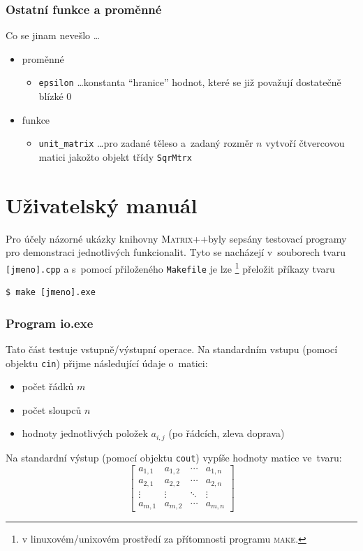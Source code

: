 \documentclass[11pt,a4paper]{article}
\newcommand{\mpp}{\textsc{Matrix++}}
\theoremstyle{remark}
\begin{document}
\section{Ostatní funkce a proměnné}

Co se jinam nevešlo \ldots

\begin{itemize}
\item proměnné
  \begin{itemize}
  \item \verb=epsilon= \ldots konstanta ``hranice'' hodnot, které se již
    považují dostatečně blízké $0$
  \end{itemize}
\item funkce
  \begin{itemize}
  \item \verb=unit_matrix= \ldots pro zadané těleso a~zadaný rozměr $n$ vytvoří
    čtvercovou matici jakožto objekt třídy \verb=SqrMtrx=
  \end{itemize}
\end{itemize}

\pagebreak

\part{Uživatelský manuál}
Pro účely názorné ukázky knihovny \mpp byly sepsány testovací programy pro
demonstraci jednotlivých funkcionalit.
Tyto se nacházejí v~souborech tvaru \verb=[jmeno].cpp= a s~pomocí přiloženého
\verb=Makefile= je lze\thinspace%
\footnote{v linuxovém/unixovém prostředí za přítomnosti programu
\textsc{make\/}.}
přeložit příkazy tvaru
\begin{verbatim}
$ make [jmeno].exe
\end{verbatim}

\section{Program io.exe} \label{io.exe}

Tato část testuje vstupně/výstupní operace.
Na standardním vstupu (pomocí objektu \verb=cin=) přijme následující údaje
o~matici:
\begin{itemize}
\item počet řádků $m$
\item počet sloupců $n$
\item hodnoty jednotlivých položek $a_{i,j}$ (po řádcích, zleva doprava)
\end{itemize}
Na standardní výstup (pomocí objektu \verb=cout=) vypíše hodnoty matice
ve~tvaru:
\[
  \begin{bmatrix}
    a_{1,1} & a_{1,2} & \cdots & a_{1,n} \\
    a_{2,1} & a_{2,2} & \cdots & a_{2,n} \\
    \vdots  & \vdots  & \ddots & \vdots  \\
    a_{m,1} & a_{m,2} & \cdots & a_{m,n}
  \end{bmatrix}
\]
\end{document}
